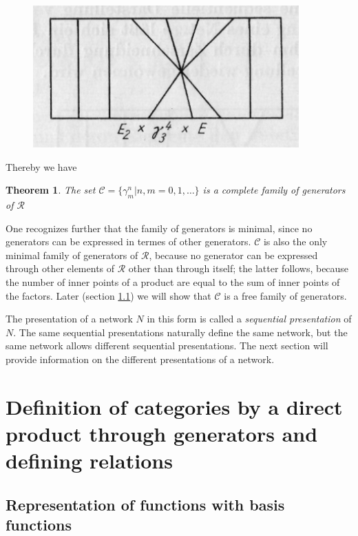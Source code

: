 \documentclass{article}
\newtheorem{theorem}{Theorem}
\begin{document}
\begin{figure}
\includegraphics[]{figure9.png}
\caption{}
\label{fig:figure9}
\end{figure}

Thereby we have

\begin{theorem}
The set $\mathcal{C} = \{ \gamma_m^n | n, m = 0, 1, \ldots \}$ is a complete family of generators of $\mathcal{R}$
\end{theorem}

One recognizes further that the family of generators is minimal, since no generators can be expressed in termes of other generators. $\mathcal{C}$ is also the only minimal family of generators of $\mathcal{R}$, because no generator can be expressed through other elements of $\mathcal{R}$ other than through itself; the latter follows, because the number of inner points of a product are equal to the sum of inner points of the factors. Later (section \ref{basis-function-representation}) we will show that $\mathcal{C}$ is
a free family of generators.

The presentation of a network $N$ in this form is called a \emph{sequential presentation} of $N$. The same sequential presentations naturally define the same network, but the same network allows different sequential presentations. The next section will provide information on the different presentations of a network.

\section{Definition of categories by a direct product through generators and defining relations}
\subsection{Representation of functions with basis functions}
\label{basis-function-representation}
\end{document}
